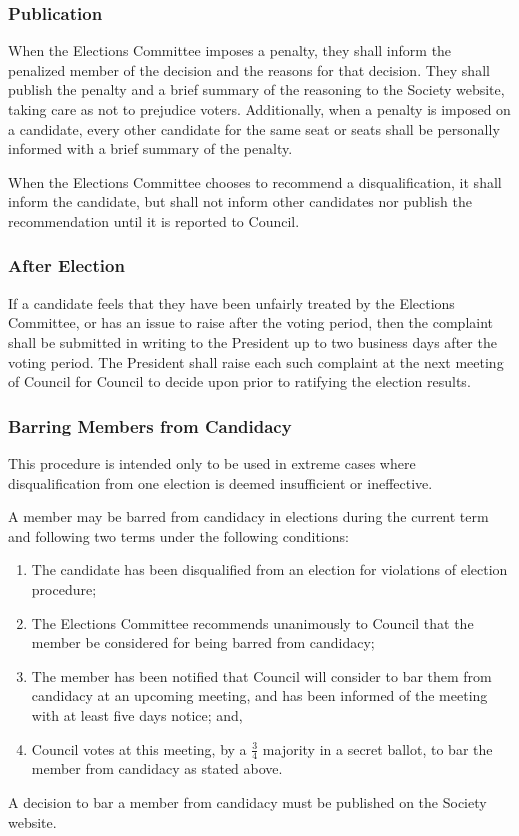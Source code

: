 \subsubsection{Publication}
When the Elections Committee imposes a penalty, they shall inform the penalized member of the decision and the reasons for that decision.
They shall publish the penalty and a brief summary of the reasoning to the Society website, taking care as not to prejudice voters.
Additionally, when a penalty is imposed on a candidate, every other candidate for the same seat or seats shall be personally informed with a brief summary of the penalty.

When the Elections Committee chooses to recommend a disqualification, it shall inform the candidate, but shall not inform other candidates nor publish the recommendation until it is reported to Council.

\subsubsection{After Election}
If a candidate feels that they have been unfairly treated by the Elections Committee, or has an issue to raise after the voting period, then the complaint shall be submitted in writing to the President up to two business days after the voting period.
The President shall raise each such complaint at the next meeting of Council for Council to decide upon prior to ratifying the election results.

\subsubsection{Barring Members from Candidacy}
This procedure is intended only to be used in extreme cases where disqualification from one election is deemed insufficient or ineffective.

A member may be barred from candidacy in elections during the current term and following two terms under the following conditions:
\begin{enumerate}
    \item The candidate has been disqualified from an election for violations of election procedure; %
    \item The Elections Committee recommends unanimously to Council that the member be considered for being barred from candidacy;
    \item The member has been notified that Council will consider to bar them from candidacy at an upcoming meeting, and has been informed of the meeting with at least five days notice; and,
    \item Council votes at this meeting, by a $\frac34$ majority in a secret ballot, to bar the member from candidacy as stated above.
\end{enumerate}
A decision to bar a member from candidacy must be published on the Society website.

